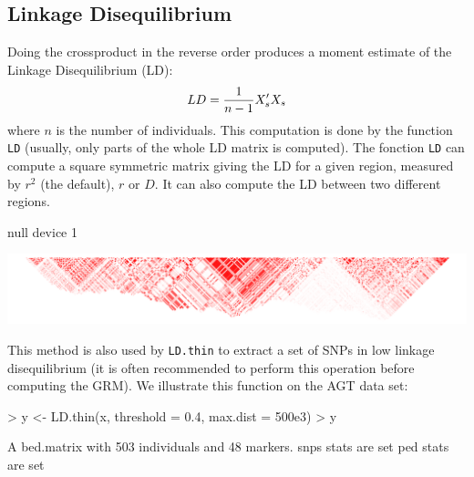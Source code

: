 \documentclass{article}
\renewenvironment{Schunk}{\vspace{\topsep}}{\vspace{\topsep}}
\begin{document}
\vfill\eject
\subsection{Linkage Disequilibrium}

  Doing the crossproduct in the reverse order produces a moment estimate of the 
  Linkage Disequilibrium (LD):
  \begin{equation*} 
    LD = {1\over n-1} X_s'X_s 
  \end{equation*}
  where $n$ is the number of individuals. This computation is done by the function
  \verb!LD! (usually, only parts of the whole LD matrix is computed).  
  The fonction \verb!LD! can compute a square symmetric matrix giving the LD for a given 
  region, measured by $r^2$ (the default), $r$ or $D$. It can also compute the LD  between
  two different regions.

\begin{center}
\begin{Schunk}
\begin{Soutput}
null device 
          1 
\end{Soutput}
\end{Schunk}
\includegraphics[width=\textwidth]{LD_AGT.pdf}
\end{center}

  This method is 
  also used by \verb!LD.thin! to extract a set of SNPs in low linkage disequilibrium
  (it is often recommended to perform this operation before computing the GRM). We illustrate
  this function on the AGT data set:

\begin{Schunk}
\begin{Sinput}
> y <- LD.thin(x, threshold = 0.4, max.dist = 500e3)
> y
\end{Sinput}
\begin{Soutput}
A bed.matrix with 503 individuals and 48 markers.
snps stats are set
ped stats are set
\end{Soutput}
\end{Schunk}
\end{document}

